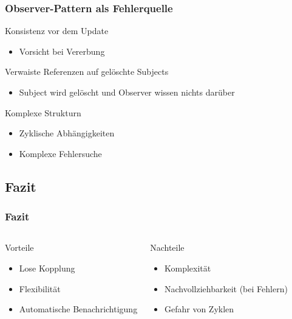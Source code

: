 \begin{frame}
\frametitle{Observer-Pattern als Fehlerquelle}
		\begin{block}{Konsistenz vor dem Update}
			\begin{itemize}
  				\item Vorsicht bei Vererbung
  			\end{itemize}  
  		\end{block}		
	\begin{block}{Verwaiste Referenzen auf gelöschte Subjects}
			\begin{itemize}
  				\item Subject wird gelöscht und Observer wissen nichts darüber
  			\end{itemize}  
  		\end{block}	
  		\begin{block}{Komplexe Strukturn}
			\begin{itemize}
  				\item Zyklische Abhängigkeiten
  				\item Komplexe Fehlersuche
  			\end{itemize}  
  		\end{block}	
		
\end{frame}


\subsection{Fazit}
\begin{frame}
	\frametitle{Fazit}
	\begin{columns} 
    		\begin{exampleblock}{Vorteile}
    			\begin{itemize}
    				\item Lose Kopplung
    				\item Flexibilität
    				\item Automatische Benachrichtigung
    			\end{itemize}
    		\end{exampleblock}
    		\begin{alertblock}{Nachteile}
    			\begin{itemize}
    				\item Komplexität
    				\item Nachvollziehbarkeit (bei Fehlern)
    				\item Gefahr von Zyklen
    			\end{itemize}
    		\end{alertblock}
  	\end{columns}   	  		
\end{frame}